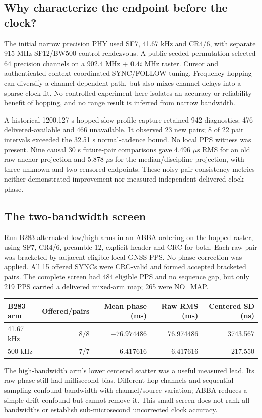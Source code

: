 \documentclass[10pt,letterpaper]{article}
\newcommand{\us}{\ensuremath{\mu\mathrm{s}}}
\begin{document}
\subsection{Why characterize the endpoint before the clock?}
The initial narrow precision PHY used SF7, 41.67 kHz and CR4/6, with separate
915 MHz SF12/BW500 control rendezvous. A public seeded permutation selected
64 precision channels on a 902.4 MHz + $0.4i$ MHz raster. Cursor and authenticated
context coordinated SYNC/FOLLOW tuning. Frequency hopping can diversify a
channel-dependent path, but also mixes channel delays into a sparse clock fit.
No controlled experiment here isolates an accuracy or reliability benefit of
hopping, and no range result is inferred from narrow bandwidth.

A historical 1200.127 s hopped slow-profile capture retained 942 diagnostics:
476 delivered-available and 466 unavailable. It observed 23 new pairs;
8 of 22 pair intervals exceeded the 32.51 s normal-cadence bound. No local PPS
witness was present. Nine causal 30 s future-pair comparisons gave 4.496 \us{}
RMS for an old raw-anchor projection and 5.878 \us{} for the median/discipline
projection, with three unknown and two censored endpoints. These noisy
pair-consistency metrics neither demonstrated improvement nor measured
independent delivered-clock phase.

\subsection{The two-bandwidth screen}
Run B283 alternated low/high arms in an ABBA ordering on the hopped raster,
using SF7, CR4/6, preamble 12, explicit header and CRC for both. Each raw pair
was bracketed by adjacent eligible local GNSS PPS. No phase correction was
applied. All 15 offered SYNCs were CRC-valid and formed accepted bracketed pairs.
The complete screen had 484 eligible PPS and no sequence gap, but only 219
PPS carried a delivered mixed-arm map; 265 were NO\_MAP.

\begin{center}\small
\begin{tabular}{@{}lrrrr@{}}\toprule
B283 arm & Offered/pairs & Mean phase (ms) & Raw RMS (ms) & Centered SD (ns)\\\midrule
41.67 kHz &8/8&$-76.974486$&76.974486&3743.567\\
500 kHz &7/7&$-6.417616$&6.417616&217.550\\\bottomrule
\end{tabular}
\end{center}
The high-bandwidth arm's lower centered scatter was a useful measured lead.
Its raw phase still had millisecond bias. Different hop channels and sequential
sampling confound bandwidth with channel/source variation; ABBA reduces a
simple drift confound but cannot remove it. This small screen does not rank
all bandwidths or establish sub-microsecond uncorrected clock accuracy.
\end{document}
